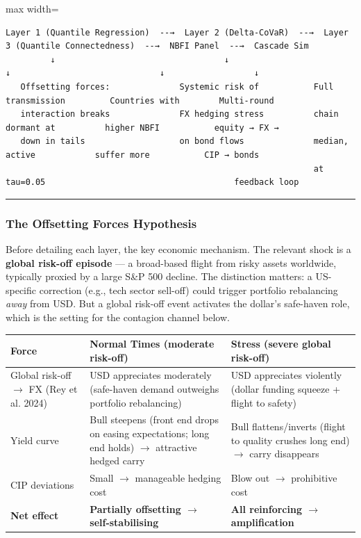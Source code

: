 \documentclass[11pt,a4paper]{article}
\begin{document}
\begin{adjustbox}{max width=\textwidth}
\begin{minipage}{1.5\textwidth}
\begin{verbatim}
Layer 1 (Quantile Regression)  --→  Layer 2 (Delta-CoVaR)  --→  Layer 3 (Quantile Connectedness)  --→  NBFI Panel  --→  Cascade Sim
         ↓                                  ↓                              ↓                              ↓                  ↓
   Offsetting forces:              Systemic risk of           Full transmission         Countries with        Multi-round
   interaction breaks              FX hedging stress          chain dormant at          higher NBFI           equity → FX →
   down in tails                   on bond flows              median, active            suffer more           CIP → bonds
                                                              at tau=0.05                                      feedback loop
\end{verbatim}
\end{minipage}
\end{adjustbox}


\bigskip\noindent\rule{\textwidth}{0.4pt}\bigskip


\subsubsection{The Offsetting Forces Hypothesis}

Before detailing each layer, the key economic mechanism. The relevant shock is a \textbf{global risk-off episode} --- a broad-based flight from risky assets worldwide, typically proxied by a large S\&P 500 decline. The distinction matters: a US-specific correction (e.g., tech sector sell-off) could trigger portfolio rebalancing \textit{away} from USD. But a global risk-off event activates the dollar's safe-haven role, which is the setting for the contagion channel below.


{\small
\begin{longtable}{|p{}|p{}|p{}|}
\hline
\textbf{Force} & \textbf{Normal Times (moderate risk-off)} & \textbf{Stress (severe global risk-off)} \\
\hline
\endhead
Global risk-off $\rightarrow$ FX (Rey et al. 2024) & USD appreciates moderately (safe-haven demand outweighs portfolio rebalancing) & USD appreciates violently (dollar funding squeeze + flight to safety) \\
\hline
Yield curve & Bull steepens (front end drops on easing expectations; long end holds) $\rightarrow$ attractive hedged carry & Bull flattens/inverts (flight to quality crushes long end) $\rightarrow$ carry disappears \\
\hline
CIP deviations & Small $\rightarrow$ manageable hedging cost & Blow out $\rightarrow$ prohibitive cost \\
\hline
\textbf{Net effect} & \textbf{Partially offsetting $\rightarrow$ self-stabilising} & \textbf{All reinforcing $\rightarrow$ amplification} \\
\hline
\end{longtable}
}
\end{document}
